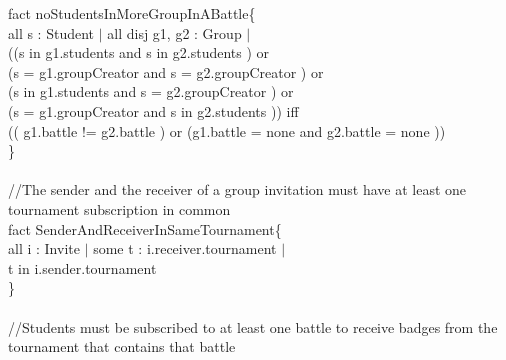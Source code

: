 \documentclass{article}
\begin{document}
{\color{black}
\color{blue} fact \color{black} noStudentsInMoreGroupInABattle\{\\
\-\hspace{1cm} \color{blue} all \color{black} s : Student $|$ \color{blue} all disj \color{black} g1, g2 : Group $|$ \\
\-\hspace{1cm}((s \color{blue} in \color{black} g1.students \color{blue} and \color{black} s \color{blue} in \color{black} g2.students ) \color{blue} or \color{black} \\
\-\hspace{1cm}(s \color{blue} = \color{black} g1.groupCreator \color{blue} and \color{black} s \color{blue} = \color{black} g2.groupCreator ) \color{blue} or \color{black}\\
\-\hspace{1cm}(s \color{blue} in \color{black} g1.students \color{blue} and \color{black} s \color{blue} = \color{black} g2.groupCreator ) \color{blue} or \color{black}\\
\-\hspace{1cm}(s \color{blue} = \color{black} g1.groupCreator \color{blue} and \color{black} s \color{blue} in \color{black} g2.students )) \color{blue} iff \\
\-\hspace{1cm}\color{black} (( g1.battle \color{blue} != \color{black} g2.battle ) \color{blue} or \color{black} (g1.battle \color{blue} = none and \color{black} g2.battle \color{blue} = none\color{black} ))\\
\}\\
\\
\noindent
\color{gray}
//The sender and the receiver of a group invitation must have at least one tournament subscription in common\\
\color{black}
\color{blue} fact \color{black} SenderAndReceiverInSameTournament\{\\
\-\hspace{1cm} \color{blue} all \color{black} i : Invite  $|$ \color{blue} some \color{black} t : i.receiver.tournament $|$ \\
\-\hspace{1cm} t \color{blue} in \color{black} i.sender.tournament\\
\}\\
\\
\color{gray}
//Students must be subscribed to at least one battle to receive badges from the tournament that contains that battle\\
}
\end{document}
